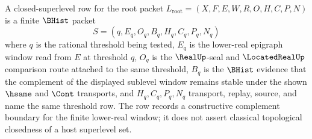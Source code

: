 \begin{definition}
\label{def:lowersemicontinuous-closed-superlevel-carrier}
A closed-superlevel row for the root packet
$L_{\mathrm{root}}=(X,F,E,W,R,O,H,C,P,N)$ is a finite $\BHist$ packet
$$
S=(q,E_q,O_q,B_q,H_q,C_q,P_q,N_q)
$$
where $q$ is the rational threshold being tested, $E_q$ is the lower-real
epigraph window read from $E$ at threshold $q$, $O_q$ is the $\RealUp$-seal and
$\LocatedRealUp$ comparison route attached to the same threshold, $B_q$ is the
$\BHist$ evidence that the complement of the displayed sublevel window remains
stable under the shown $\hsame$ and $\Cont$ transports, and $H_q,C_q,P_q,N_q$
transport, replay, source, and name the same threshold row. The row records a
constructive complement boundary for the finite lower-real window; it does not
assert classical topological closedness of a host superlevel set.
\end{definition}

